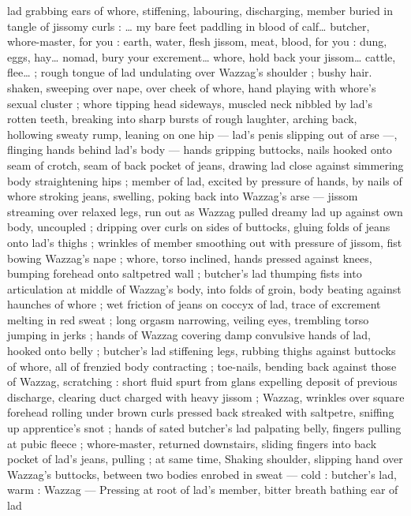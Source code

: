 lad grabbing ears of whore, stiffening, labouring, discharging, 
member buried in tangle of jissomy curls : {\gl}{\ldots} my bare feet paddling 
in blood of calf{\ldots} butcher, whore-master, for you : earth, water, flesh 
jissom, meat, blood, for you : dung, eggs, hay{\ldots} nomad, bury your 
excrement{\ldots} whore, hold back your jissom{\ldots} cattle, flee{\ldots} {\gr} ; rough 
tongue of lad undulating over Wazzag's shoulder ; bushy hair. 
shaken, sweeping over nape, over cheek of whore, hand playing with 
whore's sexual cluster ; whore tipping head sideways, muscled neck 
nibbled by lad's rotten teeth, breaking into sharp bursts of rough 
laughter, arching back, hollowing sweaty rump, leaning on one hip --- 
lad's penis slipping out of arse ---, flinging hands behind lad's body 
--- hands gripping buttocks, nails hooked onto seam of crotch, seam 
of back pocket of jeans, drawing lad close against simmering body 
straightening hips ; member of lad, excited by pressure of hands, by 
nails of whore stroking jeans, swelling, poking back into Wazzag's 
arse --- jissom streaming over relaxed legs, run out as Wazzag pulled 
dreamy lad up against own body, uncoupled ; dripping over curls on 
sides of buttocks, gluing folds of jeans onto lad's thighs ; wrinkles 
of member smoothing out with pressure of jissom, fist bowing 
Wazzag's nape ; whore, torso inclined, hands pressed against knees, 
bumping forehead onto saltpetred wall ; butcher's lad thumping fists 
into articulation at middle of Wazzag's body, into folds of groin, body 
beating against haunches of whore ; wet friction of jeans on coccyx 
of lad, trace of excrement melting in red sweat ; long orgasm 
narrowing, veiling eyes, trembling torso jumping in jerks ; hands of 
Wazzag covering damp convulsive hands of lad, hooked onto belly ; 
butcher's lad stiffening legs, rubbing thighs against buttocks of 
whore, all of frenzied body contracting ; toe-nails, bending back 
against those of Wazzag, scratching : short fluid spurt from glans 
expelling deposit of previous discharge, clearing duct charged with 
heavy jissom ; Wazzag, wrinkles over square forehead rolling under 
brown curls pressed back streaked with saltpetre, sniffing up 
apprentice's snot ; hands of sated butcher's lad palpating belly, 
fingers pulling at pubic fleece ; whore-master, returned downstairs, 
sliding fingers into back pocket of lad's jeans, pulling ; at same time, 
Shaking shoulder, slipping hand over Wazzag's buttocks, between 
two bodies enrobed in sweat --- cold : butcher's lad, warm : Wazzag 
--- Pressing at root of lad's member, bitter breath bathing ear of lad 
